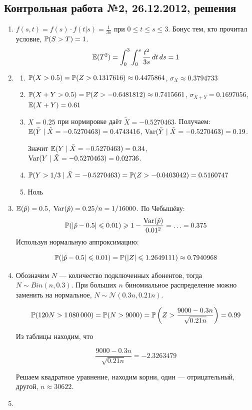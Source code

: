 \documentclass[12pt, a4paper]{article}\usepackage[]{graphicx}\usepackage[]{color}
\newcommand{\cN}{\mathcal{N}}
\begin{document}
\subsection{Контрольная работа №2, 26.12.2012, решения}
\begin{enumerate}
\item  $f(s,t)=f(s)\cdot f(t|s)=\frac{1}{3s}$ при $0\leq t\leq s\leq 3$. Бонус тем, кто прочитал условие, $\P(S>T)=1$.
\[ \E(T^2)=\int_0^3\int_0^s \frac{t^2}{3s}\,dt\,ds=1 \]
\item
\begin{enumerate}
\item $\P(X>0.5)=\P(Z>0.1317616)\approx 0.4475864$, $\sigma_X\approx 0.3794733$
\item $\P(X+Y>0.5)=
\P(Z>-0.6481812)\approx 0.7415661$,
$\sigma_{X+Y}=0.1697056$, $\E(X+Y)=0.61$

\item $X=0.25$ при нормировке даёт $\tilde{X}=-0.5270463$. Получаем: $\E(\tilde{Y}\mid \tilde{X}=-0.5270463)=0.4743416$,  $\Var(\tilde{Y}\mid \tilde{X}=-0.5270463)=0.19$.

Значит $\E(Y \mid \tilde{X}=-0.5270463)=0.34$,  $\Var(Y\mid \tilde{X}=-0.5270463)=0.02736$.

\item $\P(Y>1/3\mid \tilde{X}=-0.5270463)=\P(Z>-0.0403042)=0.5160747$
\item Ноль
\end{enumerate}
\item $\E(\hat{p})=0.5$, $\Var(\hat{p})=0.25/n=1/16000$. По Чебышёву:
\[
\P(|\hat{p}-0.5|\leq 0.01)\geq 1-\frac{\Var(\hat{p})}{0.01^2}=\ldots=0.375
\]
Используя нормальную аппроксимацию:

\[
\P(|\hat{p}-0.5|\leq 0.01)=\P(|Z|\leq 1.2649111)\approx 0.7940968
\]
\item Обозначим $N$ — количество подключенных абонентов, тогда $N\sim Bin(n,0.3)$. При больших $n$ биномиальное распределение можно заменить на нормальное, $N\sim \cN(0.3n,0.21n)$.

\[ \P(120N>1\,080\,000)=\P(N>9000)=\P\left(Z>\frac{9000-0.3n}{\sqrt{0.21n}}\right)=0.99 \]

Из таблицы находим, что

\[ \frac{9000-0.3n}{\sqrt{0.21n}}=-2.3263479\]



Решаем квадратное уравнение, находим корни, один — отрицательный, другой, $n\approx 30622$.
\item




\end{enumerate}
\end{document}
